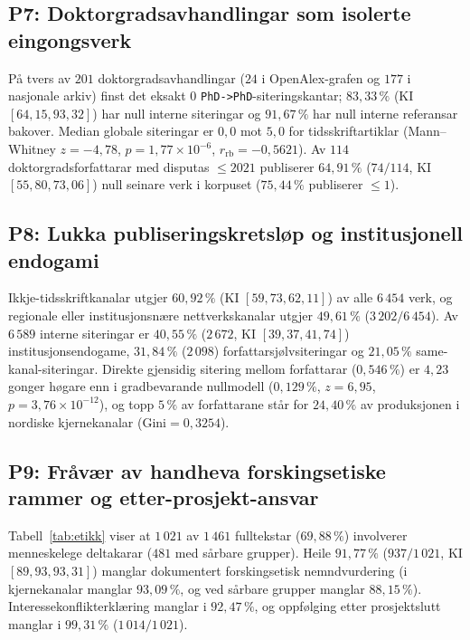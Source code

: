 \documentclass[11pt,a4paper]{article}
\begin{document}
\subsection{P7: Doktorgradsavhandlingar som isolerte eingongsverk}
På tvers av $201$ doktorgradsavhandlingar ($24$ i OpenAlex-grafen og $177$ i nasjonale arkiv) finst det eksakt $0$ \texttt{PhD->PhD}-siteringskantar; $83{,}33\,\%$ (KI $[64{,}15, 93{,}32]$) har null interne siteringar og $91{,}67\,\%$ har null interne referansar bakover. Median globale siteringar er $0{,}0$ mot $5{,}0$ for tidsskriftartiklar (Mann--Whitney $z = -4{,}78$, $p = 1{,}77 \times 10^{-6}$, $r_{\mathrm{rb}} = -0{,}5621$). Av $114$ doktorgradsforfattarar med disputas $\le 2021$ publiserer $64{,}91\,\%$ ($74/114$, KI $[55{,}80, 73{,}06]$) null seinare verk i korpuset ($75{,}44\,\%$ publiserer $\le 1$).

\subsection{P8: Lukka publiseringskretsløp og institusjonell endogami}
Ikkje-tidsskriftkanalar utgjer $60{,}92\,\%$ (KI $[59{,}73, 62{,}11]$) av alle $6\,454$ verk, og regionale eller institusjonsnære nettverkskanalar utgjer $49{,}61\,\%$ ($3\,202/6\,454$). Av $6\,589$ interne siteringar er $40{,}55\,\%$ ($2\,672$, KI $[39{,}37, 41{,}74]$) institusjonsendogame, $31{,}84\,\%$ ($2\,098$) forfattarsjølvsiteringar og $21{,}05\,\%$ same-kanal-siteringar. Direkte gjensidig sitering mellom forfattarar ($0{,}546\,\%$) er $4{,}23$ gonger høgare enn i gradbevarande nullmodell ($0{,}129\,\%$, $z = 6{,}95$, $p = 3{,}76 \times 10^{-12}$), og topp $5\,\%$ av forfattarane står for $24{,}40\,\%$ av produksjonen i nordiske kjernekanalar ($\mathrm{Gini} = 0{,}3254$).

\subsection{P9: Fråvær av handheva forskingsetiske rammer og etter-prosjekt-ansvar}
Tabell~\ref{tab:etikk} viser at $1\,021$ av $1\,461$ fulltekstar ($69{,}88\,\%$) involverer menneskelege deltakarar ($481$ med sårbare grupper). Heile $91{,}77\,\%$ ($937/1\,021$, KI $[89{,}93, 93{,}31]$) manglar dokumentert forskingsetisk nemndvurdering (i kjernekanalar manglar $93{,}09\,\%$, og ved sårbare grupper manglar $88{,}15\,\%$). Interessekonflikterklæring manglar i $92{,}47\,\%$, og oppfølging etter prosjektslutt manglar i $99{,}31\,\%$ ($1\,014/1\,021$).
\end{document}
